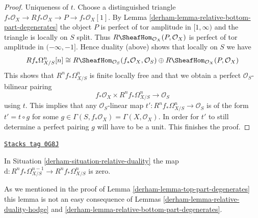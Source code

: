 \begin{proof}
\medskip\noindent
Uniqueness of $t$. Choose a distinguished triangle
$f_*\mathcal{O}_X \to Rf_*\mathcal{O}_X \to P \to f_*\mathcal{O}_X[1]$.
By Lemma \ref{derham-lemma-relative-bottom-part-degenerates}
the object $P$ is perfect of tor amplitude in $[1, \infty)$
and the triangle is locally on $S$ split.
Thus $R\SheafHom_{\mathcal{O}_X}(P, \mathcal{O}_X)$ is perfect
of tor amplitude in $(-\infty, -1]$. Hence duality (above) shows that
locally on $S$ we have
$$
Rf_*\Omega^n_{X/S}[n] \cong
R\SheafHom_{\mathcal{O}_S}(f_*\mathcal{O}_X, \mathcal{O}_S)
\oplus R\SheafHom_{\mathcal{O}_X}(P, \mathcal{O}_X)
$$
This shows that $R^nf_*\Omega^n_{X/S}$ is finite locally free and
that we obtain a perfect $\mathcal{O}_S$-bilinear pairing
$$
f_*\mathcal{O}_X \times R^nf_*\Omega^n_{X/S} \longrightarrow \mathcal{O}_S
$$
using $t$.
This implies that any $\mathcal{O}_S$-linear map
$t' : R^nf_*\Omega^n_{X/S} \to \mathcal{O}_S$ is of the form
$t' = t \circ g$ for some
$g \in \Gamma(S, f_*\mathcal{O}_X) = \Gamma(X, \mathcal{O}_X)$.
In order for $t'$ to still determine a perfect pairing $g$ will have
to be a unit. This finishes the proof.
\end{proof}

\begin{lemma}
\label{derham-lemma-relative-top-part-degenerates}
\href{https://stacks.math.columbia.edu/tag/0G8J}{\texttt{Stacks tag 0G8J}}

In Situation \ref{derham-situation-relative-duality} the map
$\text{d} : R^nf_*\Omega^{n - 1}_{X/S} \to R^nf_*\Omega^n_{X/S}$
is zero.
\end{lemma}

As we mentioned in the proof of Lemma \ref{derham-lemma-top-part-degenerates}
this lemma is not an easy consequence of Lemmas
\ref{derham-lemma-relative-duality-hodge} and
\ref{derham-lemma-relative-bottom-part-degenerates}.

